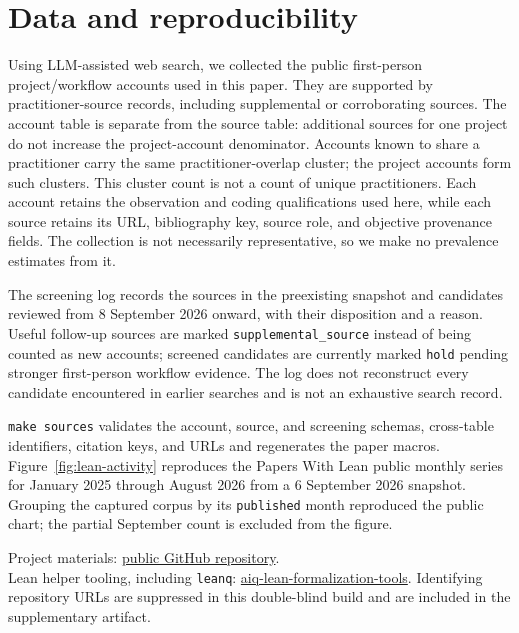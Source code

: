 \section{Data and reproducibility}
\label{app:data}

Using LLM-assisted web search, we collected the \PractitionerAccountCount{}
public first-person project/workflow accounts used in this paper.  They are
supported by \PractitionerSourceCount{} practitioner-source records, including
\PractitionerSupplementalSourceCount{} supplemental or corroborating sources.
The account table is separate from the source table: additional sources for one
project do not increase the project-account denominator.  Accounts known to
share a practitioner carry the same practitioner-overlap cluster; the
\PractitionerAccountCount{} project accounts form
\PractitionerOverlapClusterCount{} such clusters.  This cluster count is not a
count of unique practitioners.  Each account retains the observation and coding
qualifications used here, while each source retains its URL, bibliography key,
source role, and objective provenance fields.  The collection is not
necessarily representative, so we make no prevalence estimates from it.

The screening log records the sources in the preexisting snapshot and candidates
reviewed from 8 September 2026 onward, with their disposition and a reason.
Useful follow-up sources are marked \texttt{supplemental\_source} instead of
being counted as new accounts; \PractitionerHoldCount{} screened candidates are
currently marked \texttt{hold} pending stronger first-person workflow evidence.
The log does not reconstruct every candidate encountered in earlier searches
and is not an exhaustive search record.

\texttt{make sources} validates the account, source, and screening schemas,
cross-table identifiers, citation keys, and URLs and regenerates the paper macros.  Figure~\ref{fig:lean-activity}
reproduces the Papers With Lean public monthly series for January 2025 through
August 2026 from a 6 September 2026 snapshot.  Grouping the captured corpus by
its \texttt{published} month reproduced the public chart; the partial September
count is excluded from the figure.

\ifshowartifacturl
Project materials: \href{\artifacturl}{public GitHub repository}.\\
Lean helper tooling, including \texttt{leanq}: \href{\leanqurl}{aiq-lean-formalization-tools}.
\else
Identifying repository URLs are suppressed in this double-blind build and are
included in the supplementary artifact.
\fi

